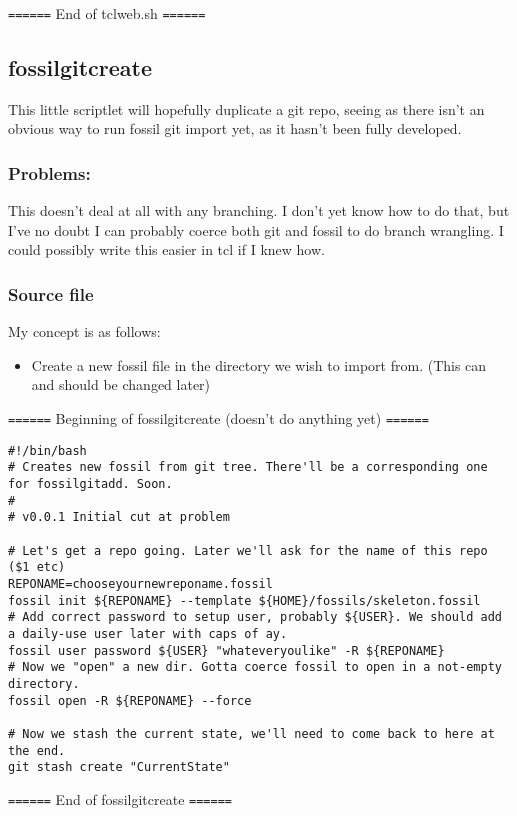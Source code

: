 \documentclass[11pt]{article}
\begin{document}
\texttt{======} End of tclweb.sh \texttt{======}


\subsection*{fossilgitcreate}
\label{sec:org678628d}
This little scriptlet will hopefully duplicate a git repo, seeing as there isn't an obvious way
to run fossil git import yet, as it hasn't been fully developed.
\subsubsection*{Problems:}
\label{sec:orgc980185}
This doesn't deal at all with any branching. I don't yet know how to do that, but I've no doubt I can
probably coerce both git and fossil to do branch wrangling.
I could possibly write this easier in tcl if I knew how.
\subsubsection*{Source file}
\label{sec:org6fdebe8}
My concept is as follows:

\begin{itemize}
\item Create a new fossil file in the directory we wish to import from. (This can and should be changed later)
\end{itemize}

\texttt{======} Beginning of fossilgitcreate (doesn't do anything yet) \texttt{======}

\begin{verbatim}
#!/bin/bash
# Creates new fossil from git tree. There'll be a corresponding one for fossilgitadd. Soon.
#
# v0.0.1 Initial cut at problem

# Let's get a repo going. Later we'll ask for the name of this repo ($1 etc)
REPONAME=chooseyournewreponame.fossil
fossil init ${REPONAME} --template ${HOME}/fossils/skeleton.fossil
# Add correct password to setup user, probably ${USER}. We should add a daily-use user later with caps of ay.
fossil user password ${USER} "whateveryoulike" -R ${REPONAME}
# Now we "open" a new dir. Gotta coerce fossil to open in a not-empty directory.
fossil open -R ${REPONAME} --force

# Now we stash the current state, we'll need to come back to here at the end.
git stash create "CurrentState"
\end{verbatim}

\texttt{======} End of fossilgitcreate \texttt{======}
\end{document}
